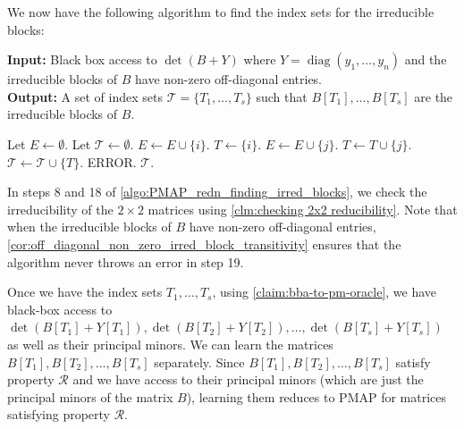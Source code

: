 \documentclass[11pt,letterpaper]{article}
\DeclareMathOperator*{\diag}{diag}
\newcommand{\prop}{\mathcal{R}}
\begin{document}
{{{We now have the following algorithm to find the index sets for the irreducible blocks:

\begin{algorithm}[H]
\caption{Finding the indices of the irreducible blocks of $\det((A+D)^{-1} + Y)$}
\label{algo:PMAP_redn_finding_irred_blocks}
\textbf{Input:} Black box access to $\det(B+Y)$ where $Y = \diag(y_1,\dots,y_n)$ and the irreducible blocks of $B$ have non-zero off-diagonal entries.\\
\textbf{Output:} A set of index sets $\mathcal{T} = \{T_1,\dots,T_s\}$ such that $B[T_1],\dots,B[T_s]$ are the irreducible blocks of $B$.
\begin{algorithmic}[1]
\State Let $E \gets \emptyset$.
\State Let $\mathcal{T} \gets \emptyset$.
        \State $E \gets E \cup \{i\}$.
        \State $T \gets \{i\}$.
            \label{alg:step-check-2-irreducible-1}
                \State $E \gets E \cup \{j\}$.
                \State $T \gets T \cup \{j\}$.
            \EndIf
        \EndFor
        \State $\mathcal{T} \gets \mathcal{T} \cup \{T\}$.
    \EndIf
\EndFor
{}
        \label{alg:step-check-2-irreducible-2}
            \label{algo:PMAP_redn_finding_irred_blocks_error}\State \Return \textsc{ERROR}.
        \EndIf
    \EndFor
\EndFor
\State \Return $\mathcal{T}$.
\end{algorithmic}
\end{algorithm}

In steps 8 and 18 of \cref{algo:PMAP_redn_finding_irred_blocks}, we check the irreducibility of the $2 \times 2$ matrices using \cref{clm:checking 2x2 reducibility}. Note that when the irreducible blocks of $B$ have non-zero off-diagonal entries, \cref{cor:off_diagonal_non_zero_irred_block_transitivity} ensures that the algorithm never throws an error in step 19.

Once we have the index sets $T_1,\dots,T_s$, using \cref{claim:bba-to-pm-oracle}, we have black-box access to $\det(B[T_1] + Y[T_1]), \det(B[T_2] + Y[T_2]), \dots, \det(B[T_s] + Y[T_s])$ as well as their principal minors. We can learn the matrices $B[T_1],B[T_2],\dots, B[T_s]$ separately. Since $B[T_1],B[T_2],\dots, B[T_s]$ satisfy property $\prop$ and we have access to their principal minors (which are just the principal minors of the matrix $B$), learning them reduces to PMAP for matrices satisfying property $\prop$.

}}}
\end{document}

